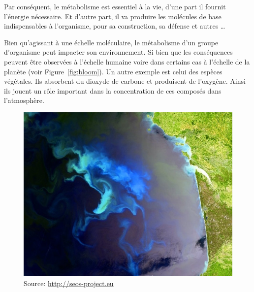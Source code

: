 \begin{refsegment}
    Par conséquent, le métabolisme est essentiel à la vie, d'une part il fournit l'énergie nécessaire. Et d'autre part, il va produire les molécules de base indispensables à l'organisme, pour sa construction, sa défense et autres \ldots
    
    Bien qu'agissant à une échelle moléculaire, le métabolisme d'un groupe d'organisme peut impacter son environnement. Si bien que les conséquences peuvent être observées à l'échelle humaine voire dans certains cas à l'échelle de la planète (voir Figure~\cref{fig:bloom}). Un autre exemple est celui des espèces végétales. Ils absorbent du dioxyde de carbone et produisent de l'oxygène. Ainsi ils jouent un rôle important dans la concentration de ces composés dans l’atmosphère.
    
    
    \begin{shadedfigure}[H]
        \begin{subfigure}[b]{.5\textwidth}
            \centering
            \includegraphics[width=\textwidth]{img/bloom_gascogne.jpg}
            \caption{{\tiny Source: \url{http://seos-project.eu}}}
            \label{fig:bloom_gascogne}
        \end{subfigure}
        \hfill
        \begin{subfigure}[b]{.5\textwidth}
            \centering

\end{subfigure}
\end{shadedfigure}
\end{refsegment}
